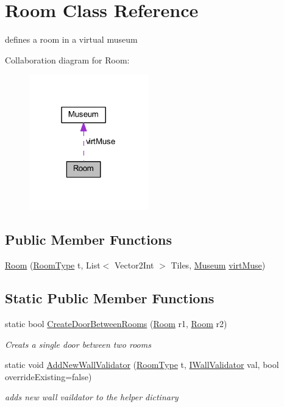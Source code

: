 \hypertarget{class_room}{}\section{Room Class Reference}
\label{class_room}


defines a room in a virtual museum  




Collaboration diagram for Room\+:
\nopagebreak
\begin{figure}[H]
\begin{center}
\leavevmode
\includegraphics[width=147pt]{class_room__coll__graph}
\end{center}
\end{figure}
\subsection*{Public Member Functions}
\begin{DoxyCompactItemize}
\item 
\mbox{\hyperlink{class_room_aae232017aa8caf310d109e90c8821227}{Room}} (\mbox{\hyperlink{_room_8cs_ab540f7414f306325d92272bcef1e34e1}{Room\+Type}} t, List$<$ Vector2\+Int $>$ Tiles, \mbox{\hyperlink{class_museum}{Museum}} \mbox{\hyperlink{class_room_a7b3cf4bdc95a8c1bf69ae4ff71b4f02a}{virt\+Muse}})
\end{DoxyCompactItemize}
\subsection*{Static Public Member Functions}
\begin{DoxyCompactItemize}
\item 
static bool \mbox{\hyperlink{class_room_a294bb89a25ac765eca25106ccb4d1955}{Create\+Door\+Between\+Rooms}} (\mbox{\hyperlink{class_room}{Room}} r1, \mbox{\hyperlink{class_room}{Room}} r2)
\begin{DoxyCompactList}\small\item\em Creats a single door between two rooms \end{DoxyCompactList}\item 
static void \mbox{\hyperlink{class_room_a99801f9d1f4ff83d049929183715c680}{Add\+New\+Wall\+Validator}} (\mbox{\hyperlink{_room_8cs_ab540f7414f306325d92272bcef1e34e1}{Room\+Type}} t, \mbox{\hyperlink{interface_i_wall_validator}{I\+Wall\+Validator}} val, bool override\+Existing=false)
\begin{DoxyCompactList}\small\item\em adds new wall vaildator to the helper dictinary \end{DoxyCompactList}\end{DoxyCompactItemize}
